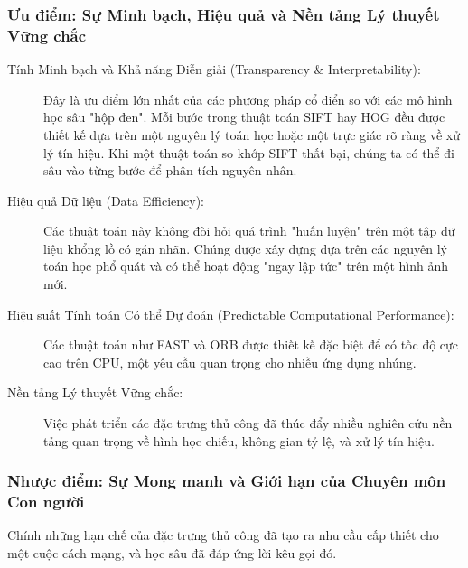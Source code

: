 \subsubsection{Ưu điểm: Sự Minh bạch, Hiệu quả và Nền tảng Lý thuyết Vững chắc}
\label{subsubsubsec:handcrafted_pros}
\begin{description}
    \item[Tính Minh bạch và Khả năng Diễn giải (Transparency \& Interpretability):] Đây là ưu điểm lớn nhất của các phương pháp cổ điển so với các mô hình học sâu "hộp đen". Mỗi bước trong thuật toán SIFT hay HOG đều được thiết kế dựa trên một nguyên lý toán học hoặc một trực giác rõ ràng về xử lý tín hiệu. Khi một thuật toán so khớp SIFT thất bại, chúng ta có thể đi sâu vào từng bước để phân tích nguyên nhân.
    
    \item[Hiệu quả Dữ liệu (Data Efficiency):] Các thuật toán này không đòi hỏi quá trình "huấn luyện" trên một tập dữ liệu khổng lồ có gán nhãn. Chúng được xây dựng dựa trên các nguyên lý toán học phổ quát và có thể hoạt động "ngay lập tức" trên một hình ảnh mới.
    
    \item[Hiệu suất Tính toán Có thể Dự đoán (Predictable Computational Performance):] Các thuật toán như FAST và ORB được thiết kế đặc biệt để có tốc độ cực cao trên CPU, một yêu cầu quan trọng cho nhiều ứng dụng nhúng.
    
    \item[Nền tảng Lý thuyết Vững chắc:] Việc phát triển các đặc trưng thủ công đã thúc đẩy nhiều nghiên cứu nền tảng quan trọng về hình học chiếu, không gian tỷ lệ, và xử lý tín hiệu.
\end{description}

\subsubsection{Nhược điểm: Sự Mong manh và Giới hạn của Chuyên môn Con người}
\label{subsubsubsec:handcrafted_cons}
Chính những hạn chế của đặc trưng thủ công đã tạo ra nhu cầu cấp thiết cho một cuộc cách mạng, và học sâu đã đáp ứng lời kêu gọi đó.

